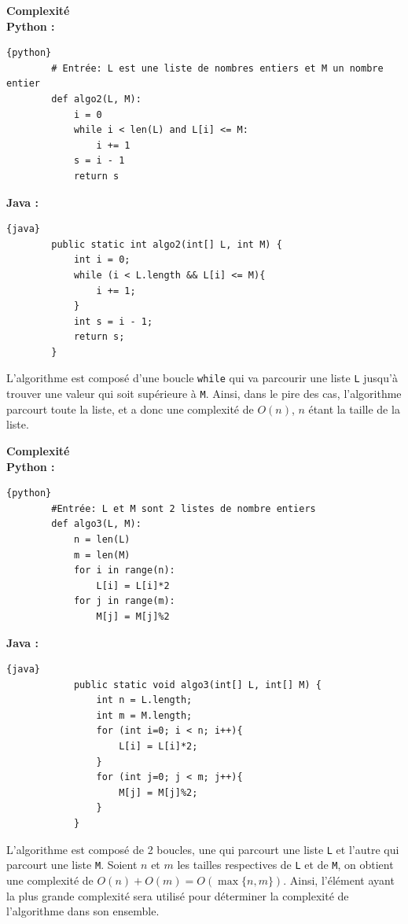 \begin{Exercice}[10 minutes] \textbf{Complexité} \\
    \textbf{Python :}
    \begin{lstlisting}{python}
        # Entrée: L est une liste de nombres entiers et M un nombre entier
        def algo2(L, M):
            i = 0
            while i < len(L) and L[i] <= M:
                i += 1
            s = i - 1
            return s
    \end{lstlisting}
    
    \textbf{Java :}
    \begin{lstlisting}{java}
        public static int algo2(int[] L, int M) {
            int i = 0;
            while (i < L.length && L[i] <= M){
                i += 1;
            }
            int s = i - 1;
            return s;
        }
    \end{lstlisting}
    \begin{solution}
    L'algorithme est composé d'une boucle \lstinline{while} qui va parcourir une liste \lstinline{L} jusqu'à trouver une valeur qui soit supérieure à \lstinline{M}. Ainsi, dans le pire des cas, l'algorithme parcourt toute la liste, et a donc une complexité de $O(n)$, $n$ étant la taille de la liste.
    \end{solution}
\end{Exercice}
\begin{Exercice}[10 minutes] \textbf{Complexité} \\

        \textbf{Python :}
        \begin{lstlisting}{python}
        #Entrée: L et M sont 2 listes de nombre entiers
        def algo3(L, M):
            n = len(L)
            m = len(M)
            for i in range(n):
                L[i] = L[i]*2
            for j in range(m):
                M[j] = M[j]%2
        \end{lstlisting}
        
        \textbf{Java :}
        \begin{lstlisting}{java}
            public static void algo3(int[] L, int[] M) {
                int n = L.length;
                int m = M.length;
                for (int i=0; i < n; i++){
                    L[i] = L[i]*2;
                }
                for (int j=0; j < m; j++){
                    M[j] = M[j]%2;
                }
            }
        \end{lstlisting}
        \begin{solution}
        L'algorithme est composé de 2 boucles, une qui parcourt une liste \lstinline{L} et l'autre qui parcourt une liste \lstinline{M}. Soient $n$ et $m$ les tailles respectives de \lstinline{L} et de \lstinline{M}, on obtient une complexité de $O(n) + O(m) = O(\max\{n,m\})$. 
        Ainsi, l'élément ayant la plus grande complexité sera utilisé pour déterminer la complexité de l'algorithme dans son ensemble.
        \end{solution}
\end{Exercice}
